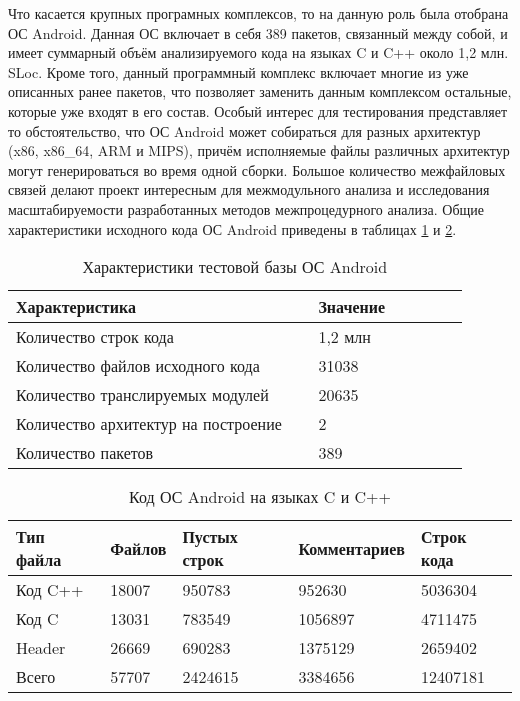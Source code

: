Что касается крупных програмных комплексов, то на данную роль была отобрана ОС Android. Данная ОС включает в себя 389 пакетов, связанный между собой, и имеет суммарный объём анализируемого кода на языках C и C++ около 1,2 млн. SLoc. Кроме того, данный программный комплекс включает многие из уже описанных ранее пакетов, что позволяет заменить данным комплексом остальные, которые уже входят в его состав. Особый интерес для тестирования представляет то обстоятельство, что ОС Android может собираться для разных архитектур (x86, x86\_64, ARM и MIPS), причём  исполняемые файлы различных архитектур могут генерироваться во время одной сборки. Большое количество межфайловых связей делают проект интересным для межмодульного анализа и исследования масштабируемости разработанных методов межпроцедурного анализа. Общие характеристики исходного кода ОС Android приведены в таблицах \ref{table:android-char} и \ref{table:android-code}.

\begin{table} [htbp]
  \centering
  \parbox{15cm}{\caption{Характеристики тестовой базы ОС Android}\label{table:android-char}}
  \begin{tabular}{| p{0.6\linewidth} || p{0.3\linewidth} |}
  \hline
  \hline
  Характеристика   & Значение \\
  \hline
  \hline
  Количество строк кода   & 1,2 млн \\
  \hline
  Количество файлов исходного кода      & 31038    \\
  \hline
  Количество транслируемых модулей  & 20635   \\
  \hline
  Количество архитектур на построение & 2   \\
  \hline
  Количество пакетов & 389 \\
  \hline
  \hline
  \end{tabular}
\end{table}

\begin{table} [htbp]
  \centering
  \parbox{15cm}{\caption{Код ОС Android на языках C и C++}\label{table:android-code}}
  \begin{tabular}{| l | l | l | l | l |}
  \hline
  \hline
  Тип файла   & Файлов   & Пустых строк   & Комментариев & Строк кода \\
  \hline
  \hline
  Код C++                  & 18007  & 950783     &    952630   &   5036304 \\
  \hline
  Код C                    & 13031  & 783549     &   1056897   &   4711475 \\
  \hline
  Header                   & 26669  & 690283     &    1375129  &   2659402 \\
  \hline
  Всего                    & 57707  & 2424615    &    3384656  &   12407181 \\
  \hline
  \hline
  \end{tabular}
\end{table}

